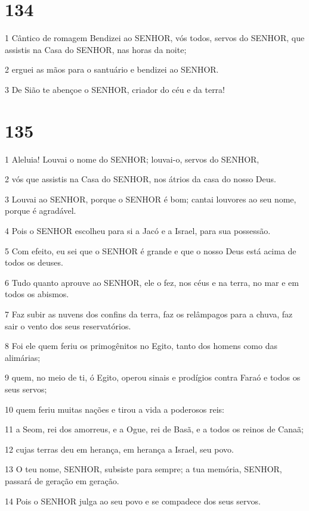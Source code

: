 \chapter{134}

\par 1 Cântico de romagem Bendizei ao SENHOR, vós todos, servos do SENHOR, que assistis na Casa do SENHOR, nas horas da noite;
\par 2 erguei as mãos para o santuário e bendizei ao SENHOR.
\par 3 De Sião te abençoe o SENHOR, criador do céu e da terra!

\chapter{135}

\par 1 Aleluia! Louvai o nome do SENHOR; louvai-o, servos do SENHOR,
\par 2 vós que assistis na Casa do SENHOR, nos átrios da casa do nosso Deus.
\par 3 Louvai ao SENHOR, porque o SENHOR é bom; cantai louvores ao seu nome, porque é agradável.
\par 4 Pois o SENHOR escolheu para si a Jacó e a Israel, para sua possessão.
\par 5 Com efeito, eu sei que o SENHOR é grande e que o nosso Deus está acima de todos os deuses.
\par 6 Tudo quanto aprouve ao SENHOR, ele o fez, nos céus e na terra, no mar e em todos os abismos.
\par 7 Faz subir as nuvens dos confins da terra, faz os relâmpagos para a chuva, faz sair o vento dos seus reservatórios.
\par 8 Foi ele quem feriu os primogênitos no Egito, tanto dos homens como das alimárias;
\par 9 quem, no meio de ti, ó Egito, operou sinais e prodígios contra Faraó e todos os seus servos;
\par 10 quem feriu muitas nações e tirou a vida a poderosos reis:
\par 11 a Seom, rei dos amorreus, e a Ogue, rei de Basã, e a todos os reinos de Canaã;
\par 12 cujas terras deu em herança, em herança a Israel, seu povo.
\par 13 O teu nome, SENHOR, subsiste para sempre; a tua memória, SENHOR, passará de geração em geração.
\par 14 Pois o SENHOR julga ao seu povo e se compadece dos seus servos.
